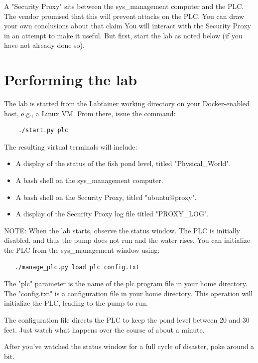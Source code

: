 \documentclass{article}
\begin{document}
A "Security Proxy" sits between the sys\_management computer and the PLC.  The vendor promised
that this will prevent attacks on the PLC.  You can draw your own conclusions about that claim
You will interact with the Security Proxy in an attempt to make it useful.  But first, start the lab
as noted below (if you have not already done so).

\section {Performing the lab}
The lab is started from the Labtainer working
directory on your Docker-enabled host, e.g., a Linux VM.
From there, issue the command:
\begin{verbatim}
    ./start.py plc
\end{verbatim}
\noindent The resulting virtual terminals will include: 
\begin{itemize}
\item A display of the status of the fish pond level, titled "Physical\_World".
\item A bash shell on the sys\_management computer.
\item A bash shell on the Security Proxy, titled "ubuntu@proxy".
\item A display of the Security Proxy log file titled "PROXY\_LOG".
\end{itemize}
NOTE: When the lab starts, observe the status window. The PLC is initially
disabled, and thus the pump does not run and the water rises.  
You can initialize the PLC from the sys\_management window using:
\begin{verbatim}
   ./manage_plc.py load plc config.txt
\end{verbatim}

\noindent The "plc" parameter is the name of the plc program file in your home directory.
The "config.txt" is a configuration file in your home directory.  This operation
will initialize the PLC, leading to the pump to run.

The configuration file directs the PLC to keep the pond level between 20 and 30 feet.
Just watch what happens over the course of about a minute.

After you've watched the status window for a full cycle of disaster, 
poke around a bit.  

\renewcommand\thesubsubsection{}
\end{document}
